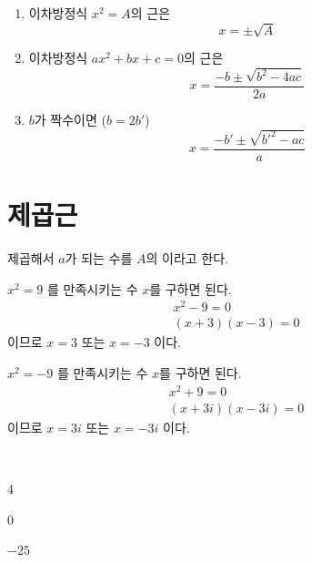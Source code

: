 \documentclass{oblivoir}
\begin{document}
\begin{mdframed}[frametitle={이차방정식의 풀이}]
\begin{enumerate}\label{review4}
\item
이차방정식 \(x^2=A\)의 근은
\[x=\pm\sqrt A\]
\item
이차방정식 \(ax^2+bx+c=0\)의 근은
\[x=\frac{-b\pm\sqrt{b^2-4ac}}{2a}\]
\item
\(b\)가 짝수이면 (\(b=2b'\))
\[x=\frac{-b'\pm\sqrt{b'^2-ac}}a\]
\end{enumerate}
\end{mdframed}

\section{제곱근}
%
\begin{mdframed}
\label{sqroot1}
제곱해서 \(a\)가 되는 수를 \(A\)의 이라고 한다.
\end{mdframed}

%
\label{sqroot2}
\vspace{-10pt}
\begin{mdframed}
\(x^2=9\)
를 만족시키는 수 \(x\)를 구하면 된다.
\begin{gather*}
x^2-9		=0\\
(x+3)(x-3)	=0
\end{gather*}
이므로 \(x=3\) 또는 \(x=-3\) 이다.
\end{mdframed}

%
\label{sqroot3}
\vspace{-10pt}
\begin{mdframed}
\(x^2=-9\)
를 만족시키는 수 \(x\)를 구하면 된다.
\begin{gather*}
x^2+9		=0\\
(x+3i)(x-3i)	=0
\end{gather*}
이므로 \(x=3i\) 또는 \(x=-3i\) 이다.
\end{mdframed}

%
\label{sqroot4}
\\[-10pt]
\begin{enumerate*}[itemjoin=\hspace{0.25\textwidth}]
\item
4
\item
0
\item
\(-25\)
\end{enumerate*}
\end{document}
